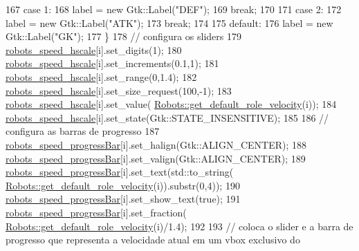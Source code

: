 \begin{DoxyCode}
167             \textcolor{keywordflow}{case} 1:
168                 label = \textcolor{keyword}{new} Gtk::Label(\textcolor{stringliteral}{"DEF"});
169                 \textcolor{keywordflow}{break};
170 
171             \textcolor{keywordflow}{case} 2:
172                 label = \textcolor{keyword}{new} Gtk::Label(\textcolor{stringliteral}{"ATK"});
173                 \textcolor{keywordflow}{break};
174 
175             \textcolor{keywordflow}{default}:
176                 label = \textcolor{keyword}{new} Gtk::Label(\textcolor{stringliteral}{"GK"});
177         \}
178         \textcolor{comment}{// configura os sliders}
179         \hyperlink{class_robot_g_u_i_a25c9dbce938a0b6fa4de5c7174d062af}{robots\_speed\_hscale}[i].set\_digits(1);
180         \hyperlink{class_robot_g_u_i_a25c9dbce938a0b6fa4de5c7174d062af}{robots\_speed\_hscale}[i].set\_increments(0.1,1);
181         \hyperlink{class_robot_g_u_i_a25c9dbce938a0b6fa4de5c7174d062af}{robots\_speed\_hscale}[i].set\_range(0,1.4);
182         \hyperlink{class_robot_g_u_i_a25c9dbce938a0b6fa4de5c7174d062af}{robots\_speed\_hscale}[i].set\_size\_request(100,-1);
183         \hyperlink{class_robot_g_u_i_a25c9dbce938a0b6fa4de5c7174d062af}{robots\_speed\_hscale}[i].set\_value(
      \hyperlink{class_robots_a4778a7c755c5cca4b5d1e2c3b46fb314}{Robots::get\_default\_role\_velocity}(i));
184         \hyperlink{class_robot_g_u_i_a25c9dbce938a0b6fa4de5c7174d062af}{robots\_speed\_hscale}[i].set\_state(Gtk::STATE\_INSENSITIVE);
185 
186         \textcolor{comment}{// configura as barras de progresso}
187         \hyperlink{class_robot_g_u_i_a2c5103a4c119635536213e8c9dd6fc3f}{robots\_speed\_progressBar}[i].set\_halign(Gtk::ALIGN\_CENTER);
188         \hyperlink{class_robot_g_u_i_a2c5103a4c119635536213e8c9dd6fc3f}{robots\_speed\_progressBar}[i].set\_valign(Gtk::ALIGN\_CENTER);
189         \hyperlink{class_robot_g_u_i_a2c5103a4c119635536213e8c9dd6fc3f}{robots\_speed\_progressBar}[i].set\_text(std::to\_string(
      \hyperlink{class_robots_a4778a7c755c5cca4b5d1e2c3b46fb314}{Robots::get\_default\_role\_velocity}(i)).substr(0,4));
190         \hyperlink{class_robot_g_u_i_a2c5103a4c119635536213e8c9dd6fc3f}{robots\_speed\_progressBar}[i].set\_show\_text(\textcolor{keyword}{true});
191         \hyperlink{class_robot_g_u_i_a2c5103a4c119635536213e8c9dd6fc3f}{robots\_speed\_progressBar}[i].set\_fraction(
      \hyperlink{class_robots_a4778a7c755c5cca4b5d1e2c3b46fb314}{Robots::get\_default\_role\_velocity}(i)/1.4);
192 
193         \textcolor{comment}{// coloca o slider e a barra de progresso que representa a velocidade atual em um vbox exclusivo do
}
\end{DoxyCode}
